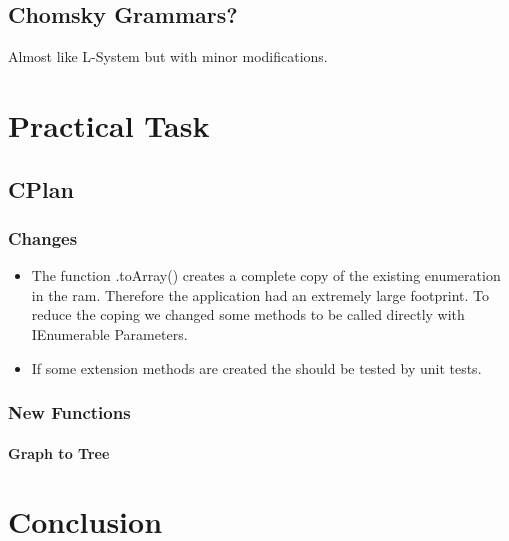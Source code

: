 \documentclass[11pt, a4paper]{report}
\begin{document}
\pagebreak
\section{Chomsky Grammars?}
\citep{PrusinkiewiczEtAl:2001}
Almost like L-System but with minor modifications.

\pagebreak
\chapter{Practical Task}
\section{CPlan}
\subsection{Changes}
\begin{itemize}
    \item The function .toArray() creates a complete copy of the existing enumeration in the ram. Therefore the application had an extremely large footprint. To reduce the coping we changed some methods to be called directly with IEnumerable Parameters.
    \item If some extension methods are created the should be tested by unit tests.
\end{itemize}


\subsection{New Functions}
\subsubsection{Graph to Tree}


\chapter{Conclusion}


\appendix
\glsaddall
\printglossaries
\end{document}
